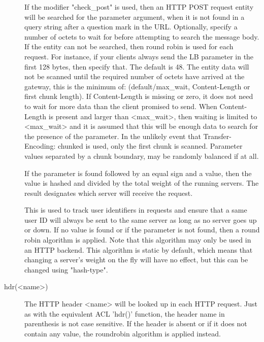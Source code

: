 \begin{description}
                  If the modifier "check\_post" is used, then an HTTP POST
                  request entity will be searched for the parameter argument,
                  when it is not found in a query string after a question mark
                   in the URL. Optionally, specify a number of octets to
                  wait for before attempting to search the message body. If the
                  entity can not be searched, then round robin is used for each
                  request. For instance, if your clients always send the LB
                  parameter in the first 128 bytes, then specify that. The
                  default is 48. The entity data will not be scanned until the
                  required number of octets have arrived at the gateway, this
                  is the minimum of: (default/max\_wait, Content-Length or first
                  chunk length). If Content-Length is missing or zero, it does
                  not need to wait for more data than the client promised to
                  send. When Content-Length is present and larger than
                  <max\_wait>, then waiting is limited to <max\_wait> and it is
                  assumed that this will be enough data to search for the
                  presence of the parameter. In the unlikely event that
                  Transfer-Encoding: chunked is used, only the first chunk is
                  scanned. Parameter values separated by a chunk boundary, may
                  be randomly balanced if at all.

                  If the parameter is found followed by an equal sign \chr{=} and
                  a value, then the value is hashed and divided by the total
                  weight of the running servers. The result designates which
                  server will receive the request.

                  This is used to track user identifiers in requests and ensure
                  that a same user ID will always be sent to the same server as
                  long as no server goes up or down. If no value is found or if
                  the parameter is not found, then a round robin algorithm is
                  applied. Note that this algorithm may only be used in an HTTP
                  backend. This algorithm is static by default, which means
                  that changing a server's weight on the fly will have no
                  effect, but this can be changed using "hash-type".

      \item[hdr(<name>)]
                  The HTTP header <name> will be looked up in each HTTP
                  request. Just as with the equivalent ACL 'hdr()' function,
                  the header name in parenthesis is not case sensitive. If the
                  header is absent or if it does not contain any value, the
                  roundrobin algorithm is applied instead.


\end{description}
